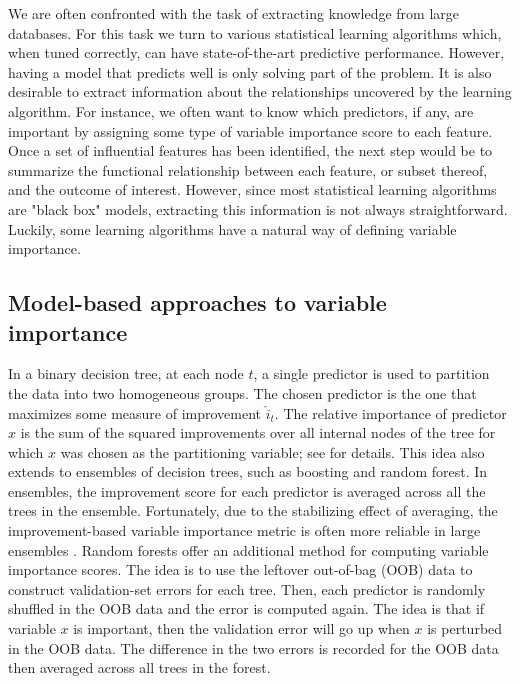 \documentclass[12pt]{article}
\begin{document}
We are often confronted with the task of extracting knowledge from large databases. For this task we turn to various statistical learning algorithms which, when tuned correctly, can have state-of-the-art predictive performance. However, having a model that predicts well is only solving part of the problem. It is also desirable to extract information about the relationships uncovered by the learning algorithm. For instance, we often want to know which predictors, if any, are important by assigning some type of variable importance score to each feature. Once a set of influential features has been identified, the next step would be to summarize the functional relationship between each feature, or subset thereof, and the outcome of interest. However, since most statistical learning algorithms are "black box" models, extracting this information is not always straightforward. Luckily, some learning algorithms have a natural way of defining variable importance.


\subsection{Model-based approaches to variable importance}

In a binary decision tree, at each node $t$, a single predictor is used to partition the data into two homogeneous groups. The chosen predictor is the one that maximizes some measure of improvement $\widehat{i}_t$. The relative importance of predictor $x$ is the sum of the squared improvements over all internal nodes of the tree for which $x$ was chosen as the partitioning variable; see \citet{classification-breiman-1984} for details. This idea also extends to ensembles of decision trees, such as boosting and random forest. In ensembles, the improvement score for each predictor is averaged across all the trees in the ensemble. Fortunately, due to the stabilizing effect of averaging, the improvement-based variable importance metric is often more reliable in large ensembles \citep[pg. 368]{hastie-elements-2009}. Random forests offer an additional method for computing variable importance scores. The idea is to use the leftover out-of-bag (OOB) data to construct validation-set errors for each tree. Then, each predictor is randomly shuffled in the OOB data and the error is computed again. The idea is that if variable $x$ is important, then the validation error will go up when $x$ is perturbed in the OOB data. The difference in the two errors is recorded for the OOB data then averaged across all trees in the forest.
\end{document}
